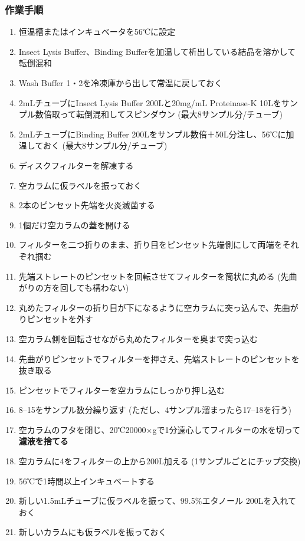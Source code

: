 \documentclass[titlepage,10pt,a4paper]{jsbook}
\begin{document}
\subsubsection{作業手順}
\begin{enumerate}
\item 恒温槽またはインキュベータを56℃に設定
\item Insect Lysis Buffer、Binding Bufferを加温して析出している結晶を溶かして転倒混和
\item Wash Buffer 1・2を冷凍庫から出して常温に戻しておく
\item 2mLチューブにInsect Lysis Buffer 200{\textmu}Lと20mg/mL Proteinase-K 10{\textmu}Lをサンプル数倍取って転倒混和してスピンダウン (最大8サンプル分/チューブ)
\item 2mLチューブにBinding Buffer 200{\textmu}Lをサンプル数倍＋50{\textmu}L分注し、56℃に加温しておく (最大8サンプル分/チューブ)
\item ディスクフィルターを解凍する
\item 空カラムに仮ラベルを振っておく
\item 2本のピンセット先端を火炎滅菌する
\item 1個だけ空カラムの蓋を開ける
\item フィルターを二つ折りのまま、折り目をピンセット先端側にして両端をそれぞれ掴む
\item 先端ストレートのピンセットを回転させてフィルターを筒状に丸める (先曲がりの方を回しても構わない)
\item 丸めたフィルターの折り目が下になるように空カラムに突っ込んで、先曲がりピンセットを外す
\item 空カラム側を回転させながら丸めたフィルターを奥まで突っ込む
\item 先曲がりピンセットでフィルターを押さえ、先端ストレートのピンセットを抜き取る
\item ピンセットでフィルターを空カラムにしっかり押し込む
\item 8--15をサンプル数分繰り返す (ただし、4サンプル溜まったら17--18を行う)
\item 空カラムのフタを閉じ、20℃20000×gで1分遠心してフィルターの水を切って\textbf{濾液を捨てる}
\item 空カラムに4をフィルターの上から200{\textmu}L加える (1サンプルごとにチップ交換)
\item 56℃で1時間以上インキュベートする
\item 新しい1.5mLチューブに仮ラベルを振って、99.5\%エタノール 200{\textmu}Lを入れておく
\item 新しいカラムにも仮ラベルを振っておく

\end{enumerate}
\end{document}
